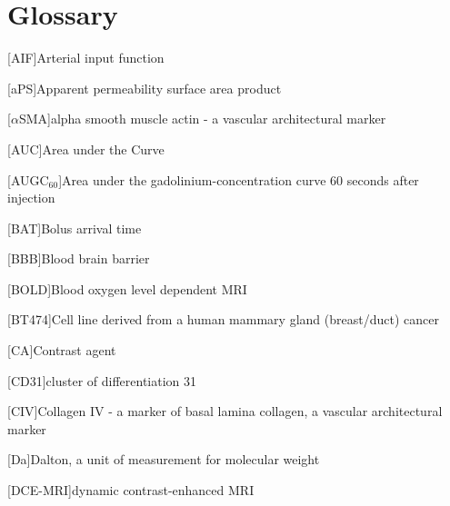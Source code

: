 
\chapter{Glossary}


\begin{acronym}

[AIF]{Arterial input function}

[aPS]{Apparent permeability surface area product}%

[$\alpha$SMA]{alpha smooth muscle actin - a vascular architectural marker}

[AUC]{Area under the Curve}%

[AUGC$_{60}$]{Area under the gadolinium-concentration curve 60 seconds after injection}

[BAT]{Bolus arrival time}

[BBB]{Blood brain barrier}

[BOLD]{Blood oxygen level dependent MRI}

[BT474]{Cell line derived from a human mammary gland (breast/duct) cancer}

[CA]{Contrast agent}

[CD31]{cluster of differentiation 31}%

[CIV]{Collagen IV - a marker of basal lamina collagen, a vascular architectural marker}

[Da]{Dalton, a unit of measurement for molecular weight}

[DCE-MRI]{dynamic contrast-enhanced MRI}


\end{acronym}
